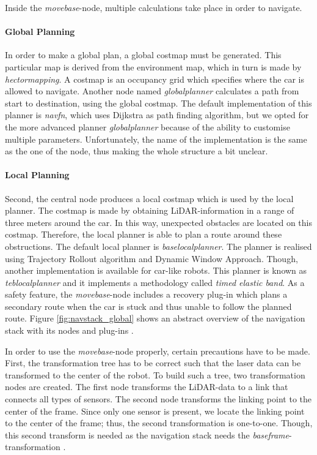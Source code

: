 \documentclass[conference,a4paper]{IEEEtran}
\begin{document}
Inside the \textit{move\textunderscore base}-node, multiple calculations take place in order to navigate. 
\paragraph{Global Planning}
In order to make a global plan, a global costmap must be generated. This particular map is derived from the environment map, which in turn is made by \emph{hector\textunderscore mapping}. A costmap is an occupancy grid which specifies where the car is allowed to navigate. Another node named \emph{global\textunderscore planner} calculates a path from start to destination, using the global costmap. The default implementation of this planner is \emph{navfn}, which uses Dijkstra as path finding algorithm, but we opted for the more advanced planner \emph{global\textunderscore planner} because of the ability to customise multiple parameters. Unfortunately, the name of the implementation is the same as the one of the node, thus making the whole structure a bit unclear. 
\paragraph{Local Planning}
Second, the central node produces a local costmap which is used by the local planner. The costmap is made by obtaining LiDAR-information in a range of three meters around the car. In this way, unexpected obstacles are located on this costmap. Therefore, the local planner is able to plan a route around these obstructions. The default local planner is \emph{base\textunderscore local\textunderscore planner}\cite{Marder-Eppstein2017_2}. The planner is realised using Trajectory Rollout algorithm and Dynamic Window Approach\cite{Fox1997, Gerkey2008}. 
Though, another implementation is available for car-like robots. This planner is known as \emph{teb\textunderscore local\textunderscore planner} and it implements a methodology called \emph{timed elastic band}\cite{Rosmann2016}. As a safety feature, the \emph{move\textunderscore base}-node includes a recovery plug-in which plans a secondary route when the car is stuck and thus unable to follow the planned route.
Figure \ref{fig:navstack_global} shows an abstract overview of the navigation stack with its nodes and plug-ins \cite{Marder-Eppstein2016_2, Zheng2016}.


In order to use the \emph{move\textunderscore base}-node properly, certain precautions have to be made. First, the transformation tree has to be correct such that the laser data can be transformed to the center of the robot. To build such a tree, two transformation nodes are created. The first node transforms the LiDAR-data to a link that connects all types of sensors. The second node transforms the linking point to the center of the frame. Since only one sensor is present, we locate the linking point to the center of the frame; thus, the second transformation is one-to-one. Though, this second transform is needed as the navigation stack needs the \emph{base\textunderscore frame}-transformation \cite{Kohlbrecher2012_tf} \cite{Woodall2015}.
\end{document}
